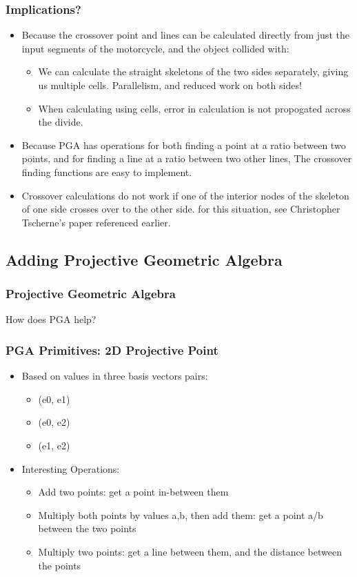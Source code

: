 \documentclass[hyperref={pdfpagemode=FullScreen},aspectratio=169]{beamer}
\begin{document}
\begin{frame}
  \frametitle{Implications?}
  \begin{itemize}
  \item Because the crossover point and lines can be calculated directly from just the input segments of the motorcycle, and the object collided with:
    \begin {itemize}
    \item We can calculate the straight skeletons of the two sides separately, giving us multiple cells. Parallelism, and reduced work on both sides!
    \item When calculating using cells, error in calculation is not propogated across the divide.
    \end {itemize}
  \item Because PGA has operations for both finding a point at a ratio between two points, and for finding a line at a ratio between two other lines, The crossover finding functions are easy to implement.
  \item Crossover calculations do not work if one of the interior nodes of the skeleton of one side crosses over to the other side. for this situation, see Christopher Tscherne's paper referenced earlier.
  \end {itemize}
\end{frame}

\subsection{Adding Projective Geometric Algebra}

\begin{frame}
  \frametitle{Projective Geometric Algebra}
  \Huge{\centerline{How does PGA help?}}
\end{frame}

\begin{frame}
  \frametitle{PGA Primitives: 2D Projective Point}
  \begin{itemize}
  \item Based on values in three basis vectors pairs:
    \begin {itemize}
    \item (e0, e1)
    \item (e0, e2)
    \item (e1, e2)
    \end{itemize}
  \item Interesting Operations:
    \begin {itemize}
    \item Add two points: get a point in-between them
    \item Multiply both points by values a,b, then add them: get a point a/b between the two points
    \item Multiply two points: get a line between them, and the distance between the points
    \end{itemize}
  \end{itemize}
\end{frame}
\end{document}
